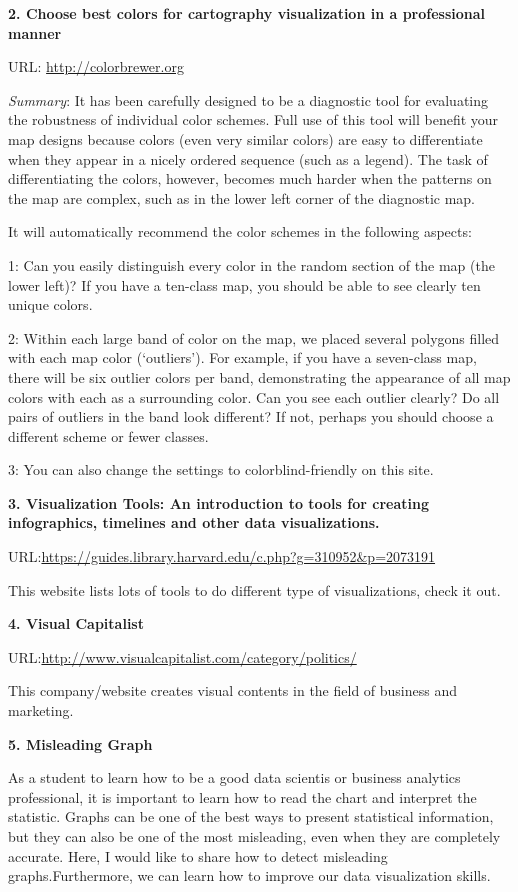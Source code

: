 \documentclass[]{book}
\theoremstyle{definition}
\theoremstyle{definition}
\theoremstyle{definition}
\theoremstyle{remark}
\begin{document}
\textbf{2. Choose best colors for cartography visualization in a
professional manner}

URL: \url{http://colorbrewer.org}

\emph{Summary}: It has been carefully designed to be a diagnostic tool
for evaluating the robustness of individual color schemes. Full use of
this tool will benefit your map designs because colors (even very
similar colors) are easy to differentiate when they appear in a nicely
ordered sequence (such as a legend). The task of differentiating the
colors, however, becomes much harder when the patterns on the map are
complex, such as in the lower left corner of the diagnostic map.

It will automatically recommend the color schemes in the following
aspects:

1: Can you easily distinguish every color in the random section of the
map (the lower left)? If you have a ten-class map, you should be able to
see clearly ten unique colors.

2: Within each large band of color on the map, we placed several
polygons filled with each map color (`outliers'). For example, if you
have a seven-class map, there will be six outlier colors per band,
demonstrating the appearance of all map colors with each as a
surrounding color. Can you see each outlier clearly? Do all pairs of
outliers in the band look different? If not, perhaps you should choose a
different scheme or fewer classes.

3: You can also change the settings to colorblind-friendly on this site.

\textbf{3. Visualization Tools: An introduction to tools for creating
infographics, timelines and other data visualizations.}

URL:\url{https://guides.library.harvard.edu/c.php?g=310952\&p=2073191}

This website lists lots of tools to do different type of visualizations,
check it out.

\textbf{4. Visual Capitalist}

URL:\url{http://www.visualcapitalist.com/category/politics/}

This company/website creates visual contents in the field of business
and marketing.

\textbf{5. Misleading Graph}

As a student to learn how to be a good data scientis or business
analytics professional, it is important to learn how to read the chart
and interpret the statistic. Graphs can be one of the best ways to
present statistical information, but they can also be one of the most
misleading, even when they are completely accurate. Here, I would like
to share how to detect misleading graphs.Furthermore, we can learn how
to improve our data visualization skills.
\end{document}
